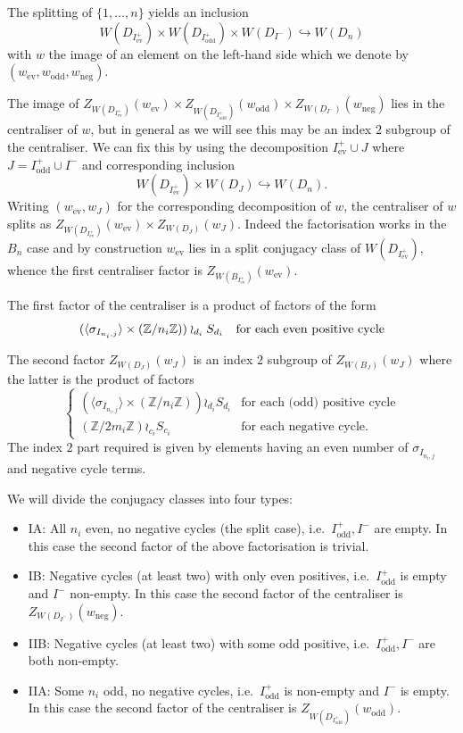 \documentclass[11pt,a4paper]{article}
\def\Z{\mathbb{Z}}
\def\ev{\mathrm{ev}}
\def\odd{\mathrm{odd}}
\def\neg{\mathrm{neg}}
\begin{document}
The splitting of $\{1,\dots, n\}$ yields an inclusion
\[
W(D_{I^+_{\ev}})\times W(D_{I^+_{\odd}})\times W(D_{I^-}) \hookrightarrow W(D_n)
\]
with $w$ the image of an element on the left-hand side which we denote by $(w_{\ev},w_{\odd},w_\neg)$.

The image of $Z_{W(D_{I^+_{\ev}})}(w_{\ev})\times Z_{W(D_{I^+_{\odd}})}(w_{\odd})\times Z_{W(D_{I^-})}(w_\neg)$ lies in the centraliser of $w$, but in general as we will see this may be an index $2$ subgroup of the centraliser.
We can fix this by using the decomposition $I^+_{\ev}\cup J$ where $J=I^+_{\odd}\cup I^-$ and corresponding inclusion
\[
W(D_{I^+_{\ev}})\times W(D_{J}) \hookrightarrow W(D_n).
\]
Writing $(w_{\ev},w_{J})$ for the corresponding decomposition of $w$, the centraliser of $w$ splits as $Z_{W(D_{I^+_{\ev}})}(w_{\ev})\times Z_{W(D_{J})}(w_{J})$.  Indeed the factorisation works in the $B_n$ case and by construction $w_{\ev}$ lies in a split conjugacy class of $W(D_{I^+_{\ev}})$, whence the first centraliser factor is $Z_{W(B_{I^+_{\ev}})}(w_{\ev})$.

The first factor of the centraliser is a product of factors of the form
\[
(\langle \sigma_{I_{n_i,j}}\rangle \times (\Z/n_i\Z))\wr_{d_i}S_{d_i} \quad\text{for each even positive cycle}\\
\]

The second factor $Z_{W(D_{J})}(w_{J})$ is an index $2$ subgroup of $Z_{W(B_{J})}(w_{J})$ where the latter is the product of factors
\[
\begin{cases}
(\langle \sigma_{I_{n_i,j}}\rangle \times (\Z/n_i\Z))\wr_{d_i}S_{d_i} & \text{for each (odd) positive cycle}\\
(\Z/2m_i\Z)\wr_{c_i}S_{c_i}& \text{for each negative cycle.}
\end{cases}
\]
The index $2$ part required is given by elements having an even number of $\sigma_{I_{n_i,j}}$ and negative cycle terms.

We will divide the conjugacy classes into four types:
\begin{itemize}
    \item IA: All $n_i$ even, no negative cycles (the split case), i.e.\  $I^+_{\odd},I^-$ are empty. In this case the second factor of the above factorisation is trivial.
    
    \item IB: Negative cycles (at least two) with only even positives, i.e.\  $I^+_{\odd}$ is empty and $I^-$ non-empty. In this case the second factor of the centraliser is $Z_{W(D_{I^-})}(w_\neg)$.
    
    \item IIB: Negative cycles (at least two) with some odd positive, i.e.\  $I^+_{\odd},I^-$ are both non-empty.

    \item IIA: Some $n_i$ odd, no negative cycles, i.e.\ $I^+_{\odd}$ is non-empty and $I^-$ is empty. In this case the second factor of the centraliser is $Z_{W(D_{I^+_{\odd}})}(w_{\odd})$.

    
\end{itemize}
\end{document}
